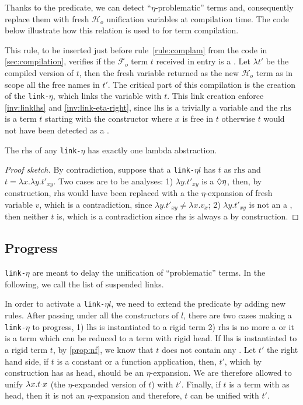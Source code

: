 \documentclass[sigconf,natbib=false,review]{acmart}
\newcommand{\appsep}{\ensuremath{\textcolor{lightgray}{\cdot}}}
\newcommand{\linketa}{\texttt{link-}\ensuremath{\eta}\xspace}
\newcommand{\Fo}{\ensuremath{\mathcal{F}_{\!o}\xspace}} %
\newcommand{\Ho}{\ensuremath{\mathcal{H}_o}\xspace}
\newcommand{\lhs}{\ensuremath{\mathrm{lhs}}\xspace}
\newcommand{\rhs}{\ensuremath{\mathrm{rhs}}\xspace}
\begin{document}
Thanks to the  predicate, we can detect ``$\eta$-problematic''
terms and, consequently replace them with fresh \Ho unification variables at
compilation time. The code below illustrate how this relation is used to for
term compilation.



This rule, to be inserted just before rule~\ref{rule:complam} from the code in
\cref{sec:compilation}, verifies if the \Fo{} term $t$ received in entry is a
\maybeeta. Let $\lambda t'$ be the compiled version of $t$, then the fresh
variable  returned as the new \Ho term as in scope all the free names
in $t'$. The critical part of this compilation is the creation of the \linketa,
which links the variable  with $t$. This link creation enforce
\cref{inv:linklhs} and \cref{inv:link-eta-right}, since \lhs is a trivially a
variable and the \rhs is a term $t$ starting with the  constructor where
$x$ is free in $t$ otherwise $t$ would not have been detected as a \maybeeta. 

\begin{corollary}
  The \rhs of any \linketa has exactly one lambda abstraction.
\end{corollary}

\begin{proof}[Proof sketch]
  By contradiction, suppose that a \linketa $l$ has $t$ as \rhs and $t = \lambda
  x.\lambda y.t'_{xy}$. Two cases are to be analyses: 1) $\lambda y.t'_{xy}$ is
  a $\Diamond\eta$, then, by construction, \rhs would have been replaced with a the
  $\eta$-expansion of fresh variable $v$, which is a contradiction, since
  $\lambda y.t'_{xy} \neq \lambda x.v_{x}$; 2) $\lambda y.t'_{xy}$ is not an a
  \maybeeta, then neither $t$ is, which is a contradiction since \rhs is always
  a \maybeeta by construction.
\end{proof}

\subsection{Progress}

\linketa are meant to delay the unification of ``problematic'' terms. In the
following, we call \linkStore the list of suspended links.

In order to activate a \linketa $l$, we need to extend the  predicate
by adding new rules. After passing under all the 
constructors of $l$, there are two cases making a \linketa to progress, 1) \lhs
is instantiated to a rigid term 2) \rhs is no more a \maybeeta or it is a term
which can be reduced to a term with rigid head. 
If \lhs is instantiated to a rigid term $t$, by \cref{prop:nf},
we know that $t$ does not contain any \maybeeta. Let $t'$ the right hand side,
if $t$ is a constant or a function application, then, $t'$, which by
construction has  as head, should be an $\eta$-expansion. We are
therefore allowed to unify $\lambda x. t \appsep x$ (the $\eta$-expanded version
of $t$) with $t'$. Finally, if $t$ is a term with  as head, then
it is not an $\eta$-expansion and therefore, $t$ can be unified with $t'$. 
\end{document}
